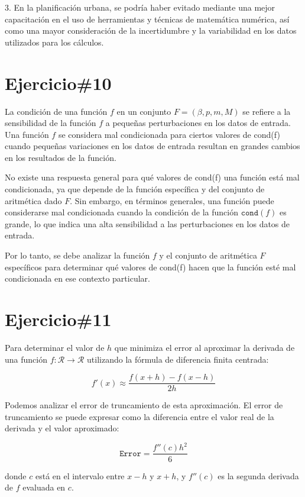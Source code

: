 \documentclass[a4paper,12pt]{article}
\begin{document}
3. En la planificación urbana, se podría haber evitado mediante una mejor capacitación en el uso de herramientas y técnicas de matemática numérica, así como una mayor consideración de la incertidumbre y la variabilidad en los datos utilizados para los cálculos.


\section*{Ejercicio\#10}

La condición de una función \( f \) en un conjunto \( F = (\beta, p, m, M) \) se refiere a la sensibilidad de la función \( f \) a pequeñas perturbaciones en los datos de entrada. Una función \( f \) se considera mal condicionada para ciertos valores de cond(f) cuando pequeñas variaciones en los datos de entrada resultan en grandes cambios en los resultados de la función.

No existe una respuesta general para qué valores de cond(f) una función está mal condicionada, ya que depende de la función específica y del conjunto de aritmética dado \( F \). Sin embargo, en términos generales, una función puede considerarse mal condicionada cuando la condición de la función \( \texttt{cond}(f) \) es grande, lo que indica una alta sensibilidad a las perturbaciones en los datos de entrada.

Por lo tanto, se debe analizar la función \( f \) y el conjunto de aritmética \( F \) específicos para determinar qué valores de cond(f) hacen que la función esté mal condicionada en ese contexto particular.


\section*{Ejercicio\#11}

Para determinar el valor de \( h \) que minimiza el error al aproximar la derivada de una función \( f: \mathcal{R}  \rightarrow \mathcal{R} \) utilizando la fórmula de diferencia finita centrada:

\[
f'(x) \approx \frac{f(x + h) - f(x - h)}{2h}
\]

Podemos analizar el error de truncamiento de esta aproximación. El error de truncamiento se puede expresar como la diferencia entre el valor real de la derivada y el valor aproximado:

\[
\texttt{Error} = \frac{f''(c)h^2}{6}
\]

donde \( c \) está en el intervalo entre \( x - h \) y \( x + h \), y \( f''(c) \) es la segunda derivada de \( f \) evaluada en \( c \).
\end{document}
